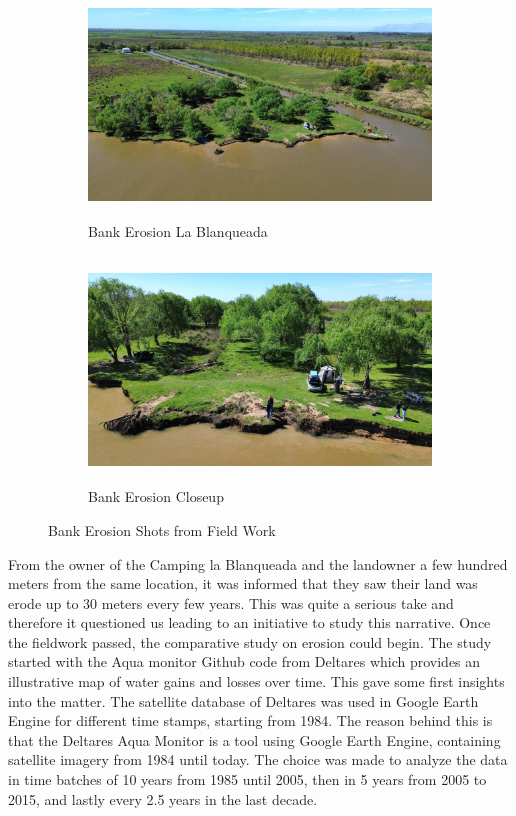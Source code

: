 \begin{figure}[H]
    \centering
    \begin{subfigure}[b]{0.6\textwidth}
        \includegraphics[width=\linewidth, height=6cm]{figures/ch4/bankerosioncamping.jpg}
        \caption{Bank Erosion La Blanqueada}
        
    \end{subfigure}
    
    \vspace{0.5cm}
    

    \begin{subfigure}[b]{0.6\textwidth}
        \includegraphics[width=\linewidth, height=6cm]{figures/ch4/bankerosioncamping2.jpg}
        \caption{Bank Erosion Closeup}
        
    \end{subfigure}
    \caption{Bank Erosion Shots from Field Work}
    \label{fig:Bank Erosion shots from field work}
\end{figure}
\label{bankerosion}


From the owner of the Camping la Blanqueada and the landowner a few hundred meters from the same location, it was informed that they saw their land was erode up to 30 meters every few years. This was quite a serious take and therefore it questioned us leading to an initiative to study this narrative.
Once the fieldwork passed, the comparative study on erosion could begin. The study started with the Aqua monitor Github code from Deltares which provides an illustrative map of water gains and losses over time. This gave some first insights into the matter. 
The satellite database of Deltares was used in Google Earth Engine for different time stamps, starting from 1984. The reason behind this is that the Deltares Aqua Monitor is a tool using Google Earth Engine, containing satellite imagery from 1984 until today. 
The choice was made to analyze the data in time batches of 10 years from 1985 until 2005, then in 5 years from 2005 to 2015, and lastly every 2.5 years in the last decade.

